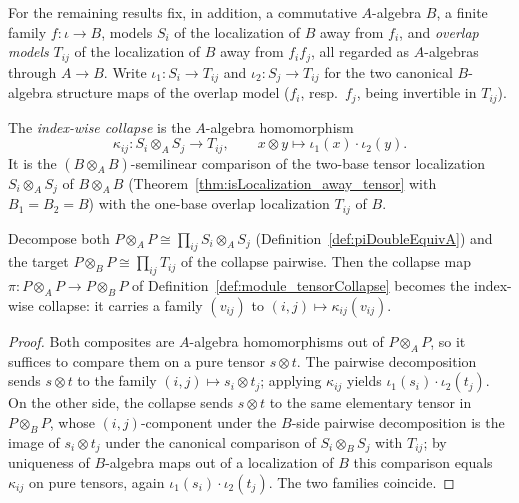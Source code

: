 For the remaining results fix, in addition, a commutative \(A\)-algebra \(B\), a finite
family \(f \colon \iota \to B\), models \(S_i\) of the localization of \(B\) away from
\(f_i\), and \emph{overlap models} \(T_{ij}\) of the localization of \(B\) away from
\(f_i f_j\), all regarded as \(A\)-algebras through \(A \to B\). Write
\(\iota_1 \colon S_i \to T_{ij}\) and \(\iota_2 \colon S_j \to T_{ij}\) for the two canonical
\(B\)-algebra structure maps of the overlap model (\(f_i\), resp.\ \(f_j\), being invertible
in \(T_{ij}\)).

\begin{definition}
  \label{def:componentCollapse}
  \leanok
  The \emph{index-wise collapse} is the \(A\)-algebra homomorphism
  \[
    \kappa_{ij} \colon S_i \otimes_A S_j \longrightarrow T_{ij}, \qquad
    x \otimes y \mapsto \iota_1(x) \cdot \iota_2(y) .
  \]
  It is the \((B \otimes_A B)\)-semilinear comparison of the two-base tensor localization
  \(S_i \otimes_A S_j\) of \(B \otimes_A B\) (Theorem~\ref{thm:isLocalization_away_tensor}
  with \(B_1 = B_2 = B\)) with the one-base overlap localization \(T_{ij}\) of \(B\).
\end{definition}

\begin{lemma}
  \label{lem:piDoubleEquiv_tensorCollapse}
  \leanok
  Decompose both \(P \otimes_A P \cong \prod_{ij} S_i \otimes_A S_j\)
  (Definition~\ref{def:piDoubleEquivA}) and the target
  \(P \otimes_B P \cong \prod_{ij} T_{ij}\) of the collapse pairwise. Then the collapse map
  \(\pi \colon P \otimes_A P \to P \otimes_B P\) of
  Definition~\ref{def:module_tensorCollapse} becomes the index-wise collapse: it carries a
  family \((v_{ij})\) to \((i,j) \mapsto \kappa_{ij}(v_{ij})\).
\end{lemma}
\begin{proof}
  \leanok
  Both composites are \(A\)-algebra homomorphisms out of \(P \otimes_A P\), so it suffices to
  compare them on a pure tensor \(s \otimes t\). The pairwise decomposition sends
  \(s \otimes t\) to the family \((i,j) \mapsto s_i \otimes t_j\); applying \(\kappa_{ij}\)
  yields \(\iota_1(s_i) \cdot \iota_2(t_j)\). On the other side, the collapse sends
  \(s \otimes t\) to the same elementary tensor in \(P \otimes_B P\), whose \((i,j)\)-component
  under the \(B\)-side pairwise decomposition is the image of \(s_i \otimes t_j\) under the
  canonical comparison of \(S_i \otimes_B S_j\) with \(T_{ij}\); by uniqueness of \(B\)-algebra
  maps out of a localization of \(B\) this comparison equals \(\kappa_{ij}\) on pure tensors,
  again \(\iota_1(s_i) \cdot \iota_2(t_j)\). The two families coincide.
\end{proof}

